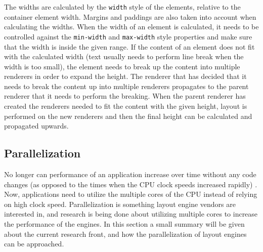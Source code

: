 \documentclass[a4paper,11pt]{kth-mag}
\newcommand{\code}[1]{\texttt{#1}}
\begin{document}
        The widths are calculated by the \code{width} style of the \glspl{element}, relative to the container \gls{element} width.
        Margins and paddings are also taken into account when calculating the widths.
        When the width of an \gls{element} is calculated, it needs to be controlled against the \code{min-width} and \code{max-width} style properties and make sure that the width is inside the given range.
        If the content of an \gls{element} does not fit with the calculated width (text usually needs to perform line break when the width is too small), the \gls{element} needs to break up the content into multiple renderers in order to expand the height.
        The renderer that has decided that it needs to break the content up into multiple renderers propagates to the parent renderer that it needs to perform the breaking.
        When the parent renderer has created the renderers needed to fit the content with the given height, layout is performed on the new renderers and then the final height can be calculated and propagated upwards.
      \subsection{Parallelization}\label{sec:parallel}
        No longer can performance of an application increase over time without any code changes (as opposed to the times when the \gls{CPU} clock speeds increased rapidly) \cite{parallelizing_the_web_browser}.
        Now, applications need to utilize the multiple cores of the \gls{CPU} instead of relying on high clock speed.
        Parallelization is something \gls{layout engine} vendors are interested in, and research is being done about utilizing multiple cores to increase the performance of the engines.
        In this section a small summary will be given about the current research front, and how the parallelization of layout engines can be approached.
\end{document}
